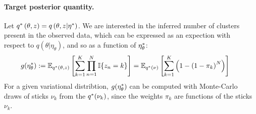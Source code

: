 

\paragraph{Target posterior quantity.}
Let $q^{*}\left(\theta, z\right) = q\left(\theta, z \vert \eta^{*}\right)$.
We are interested in the inferred number of clusters present in the observed
data, which can be expressed as an expection with respect to
$q\left(\theta \vert \eta_\theta \right)$,
and so as a function of $\eta_\theta^{*}$:
%
\begin{align}
g(\eta_\theta^{*}) &:=
\mathbb{E}_{q^{*}(\theta, z)} \left[
    \sum_{k=1}^K \prod_{n=1}^N \mathbb{I}\{z_n = k\} \right]
= \mathbb{E}_{q^{*}(\nu)}
    \left[\sum_{k=1}^K \left(1 - \left(1 - \pi_k\right)^N\right)
    \right]
    \label{eq:expected_num_clusters}
\end{align}
%
For a given variational distribtion, $g(\eta_\theta^{*})$ can be computed with
Monte-Carlo draws of sticks $\nu_k$ from the $q^{*}(\nu_k)$,
since the weights $\pi_k$ are functions of the sticks $\nu_k$.
